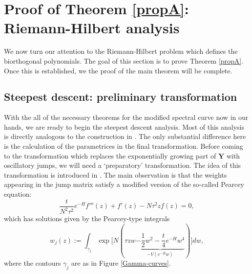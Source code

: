 \documentclass[usenames,dvipsnames]{article}
\theoremstyle{definition}
\numberwithin{equation}{section}
\numberwithin{figure}{section}
\begin{document}
\section{Proof of Theorem \ref{propA}: Riemann-Hilbert analysis}\label{section:RHP}
We now turn our attention to the Riemann-Hilbert problem which defines the biorthogonal polynomials. The goal of this section is to prove Theorem \ref{propA}. Once this is established, we the proof of the main theorem will be complete. 


\subsection{Steepest descent: preliminary transformation}

With the all of the necessary theorems for the modified spectral curve now in our hands, we are ready to begin the steepest descent analysis. Most of this analysis is directly analogous to the construction in \cite{DHL1}. The only substantial difference here is the
calculation of the parametrices in the final transformation. Before coming to the transformation which replaces the exponentially growing part of $\boldsymbol{Y}$ with oscillatory jumps, we will need a `preparatory' transformation. The idea of this transformation is introduced in \cite{DK1}. The main observation is that the weights appearing in the jump matrix satisfy a modified version of the so-called Pearcey equation:
    \begin{equation}
        \frac{t}{N^2\tau^2}e^{-H} f'''(z) + f'(z) - N\tau^2zf(z) = 0,
    \end{equation}
which has solutions given by the Pearcey-type integrals
    \begin{equation}\label{Pearcey-integrals}
        w_j(z) := \int_{\gamma_j} \exp\big[ N(\tau z w  \underbrace{-\frac{1}{2}w^2 - \frac{t}{4}e^{-H}w^4}_{-V(e^{-H}w)} )\big] dw,
    \end{equation}
where the contours $\gamma_j$ are as in Figure \ref{Gamma-curves}.
\end{document}
